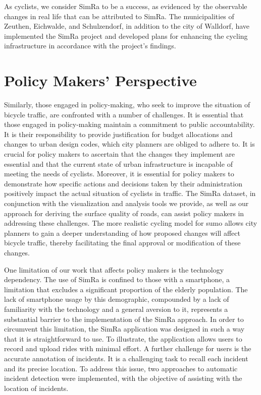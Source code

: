 As cyclists, we consider SimRa to be a success, as evidenced by the observable changes in real life that can be attributed to SimRa.
The municipalities of Zeuthen, Eichwalde, and Schulzendorf, in addition to the city of Walldorf, have implemented the SimRa project and developed plans for enhancing the cycling infrastructure in accordance with the project's findings.

\section*{Policy Makers' Perspective} 
Similarly, those engaged in policy-making, who seek to improve the situation of bicycle traffic, are confronted with a number of challenges.
It is essential that those engaged in policy-making maintain a commitment to public accountability.
It is their responsibility to provide justification for budget allocations and changes to urban design codes, which city planners are obliged to adhere to.
It is crucial for policy makers to ascertain that the changes they implement are essential and that the current state of urban infrastructure is incapable of meeting the needs of cyclists.
Moreover, it is essential for policy makers to demonstrate how specific actions and decisions taken by their administration positively impact the actual situation of cyclists in traffic.
The SimRa dataset, in conjunction with the visualization and analysis tools we provide, as well as our approach for deriving the surface quality of roads, can assist policy makers in addressing these challenges.
The more realistic cycling model for \ac{sumo} allows city planners to gain a deeper understanding of how proposed changes will affect bicycle traffic, thereby facilitating the final approval or modification of these changes.

One limitation of our work that affects policy makers is the technology dependency.
The use of SimRa is confined to those with a smartphone, a limitation that excludes a significant proportion of the elderly population. The lack of smartphone usage by this demographic, compounded by a lack of familiarity with the technology and a general aversion to it, represents a substantial barrier to the implementation of the SimRa approach.
In order to circumvent this limitation, the SimRa application was designed in such a way that it is straightforward to use.
To illustrate, the application allows users to record and upload rides with minimal effort.
A further challenge for users is the accurate annotation of incidents.
It is a challenging task to recall each incident and its precise location.
To address this issue, two approaches to automatic incident detection were implemented, with the objective of assisting with the location of incidents.


